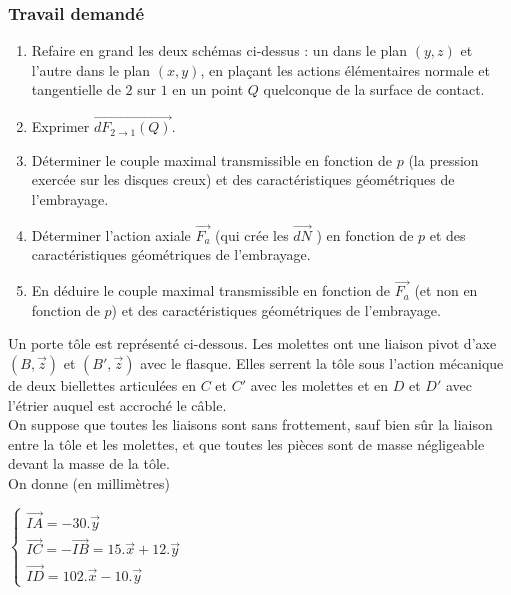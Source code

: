 \subsubsection{Travail demandé}
\begin{enumerate}
\item Refaire en grand les deux schémas ci-dessus : un dans le plan $(y, z)$ et l’autre dans le plan $(x, y)$, en plaçant les actions élémentaires normale et tangentielle de $2$ sur $1$ en un point $Q$ quelconque de la surface de contact.
\item Exprimer $\overrightarrow{dF_{2\rightarrow1}(Q)}$.
\item Déterminer le couple maximal transmissible en fonction de $p$ (la pression exercée sur les disques creux) et des caractéristiques géométriques de l’embrayage.
\item Déterminer l’action axiale $\overrightarrow{F_a}$ (qui crée les $\overrightarrow{dN}$ ) en fonction de $p$ et des caractéristiques géométriques de l’embrayage.
\item En déduire le couple maximal transmissible en fonction de $\overrightarrow{F_a}$ (et non en fonction de $p$) et des caractéristiques géométriques de l’embrayage.
\end{enumerate}

\newpage



Un porte tôle est représenté ci-dessous. Les molettes ont une liaison pivot d'axe $(B,\overrightarrow{z})$ et $(B',\overrightarrow{z})$ avec le flasque. Elles serrent la tôle sous l'action mécanique de deux biellettes articulées en $C$ et $C'$ avec les molettes et en $D$ et $D'$ avec l'étrier auquel est accroché le câble.\\
On suppose que toutes les liaisons sont sans frottement, sauf bien sûr la liaison entre la tôle et les molettes, et que toutes les pièces sont de masse négligeable devant la masse de la tôle.\\
On donne (en millimètres)
\begin{center}
$\left\{
\begin{array}{rcl}
	\overrightarrow{IA}=-30.\overrightarrow{y}\\
	\overrightarrow{IC}=-\overrightarrow{IB}=15.\overrightarrow{x}+12.\overrightarrow{y}\\
	\overrightarrow{ID}=102.\overrightarrow{x}-10.\overrightarrow{y}
\end{array}\right.$
\end{center}

